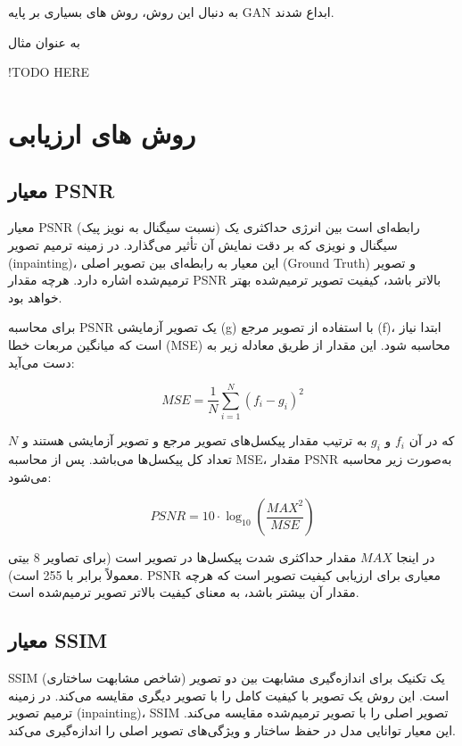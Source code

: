 به دنبال این روش، روش های بسیاری بر پایه GAN ابداع شدند. 
\cite{caoLearningSketchTensor2021}
\cite{guoImageInpaintingConditional2024}
\cite{liRecurrentFeatureReasoning2020}
\cite{nazeriEdgeConnectGenerativeImage2019}
\cite{pengGeneratingDiverseStructure2021}

به عنوان مثال


!TODO HERE

\section{روش های ارزیابی}

\subsection{معیار PSNR}
معیار PSNR (نسبت سیگنال به نویز پیک) رابطه‌ای است بین انرژی حداکثری یک سیگنال و نویزی که بر دقت نمایش آن تأثیر می‌گذارد. در زمینه ترمیم تصویر (inpainting)، این معیار به رابطه‌ای بین تصویر اصلی (Ground Truth) و تصویر ترمیم‌شده اشاره دارد. هرچه مقدار PSNR بالاتر باشد، کیفیت تصویر ترمیم‌شده بهتر خواهد بود.

برای محاسبه PSNR یک تصویر آزمایشی (g) با استفاده از تصویر مرجع (f)، ابتدا نیاز است که میانگین مربعات خطا (MSE) محاسبه شود. این مقدار از طریق معادله زیر به دست می‌آید:

\[
MSE = \frac{1}{N} \sum_{i=1}^{N} (f_i - g_i)^2
\]

که در آن $f_i$ و $g_i$ به ترتیب مقدار پیکسل‌های تصویر مرجع و تصویر آزمایشی هستند و $N$ تعداد کل پیکسل‌ها می‌باشد. پس از محاسبه MSE، مقدار PSNR به‌صورت زیر محاسبه می‌شود:

\begin{equation}
PSNR = 10 \cdot \log_{10}\left(\frac{MAX^2}{MSE}\right)
\end{equation}

در اینجا $MAX$ مقدار حداکثری شدت پیکسل‌ها در تصویر است (برای تصاویر 8 بیتی معمولاً برابر با 255 است). PSNR معیاری برای ارزیابی کیفیت تصویر است که هرچه مقدار آن بیشتر باشد، به معنای کیفیت بالاتر تصویر ترمیم‌شده است.

\subsection{معیار SSIM}

SSIM (شاخص مشابهت ساختاری) یک تکنیک برای اندازه‌گیری مشابهت بین دو تصویر است. این روش یک تصویر با کیفیت کامل را با تصویر دیگری مقایسه می‌کند. در زمینه ترمیم تصویر (inpainting)، SSIM تصویر اصلی را با تصویر ترمیم‌شده مقایسه می‌کند. این معیار توانایی مدل در حفظ ساختار و ویژگی‌های تصویر اصلی را اندازه‌گیری می‌کند.

